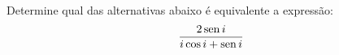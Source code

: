 \question[20]
Determine qual das alternativas abaixo é equivalente a expressão:
\[ 
  \frac
  {
   2 \operatorname{sen}{i}
  }
  {
   i \cos{i} + \operatorname{sen}{i}
  }
\] 

\begin{multicols}{5}
\end{multicols}



